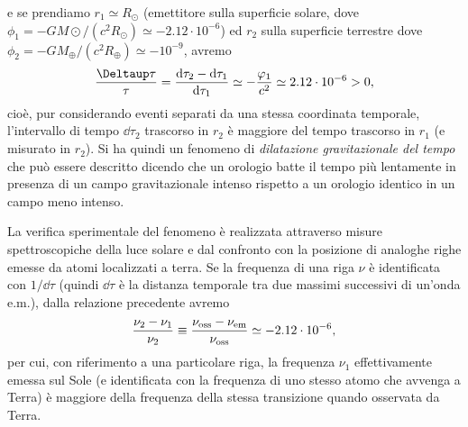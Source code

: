 e se prendiamo $r_1 \simeq R_\odot$ (emettitore sulla superficie solare, dove
$\phi_1 = - GM{\odot}/(c^2 R_{\odot}) \simeq -2.12 \cdot 10^{-6}$) ed $r_2$
sulla superficie terrestre dove $\phi_2 = -GM_{\oplus}/(c^2 R_{\oplus}) \simeq -
10^{-9}$, avremo
\begin{equation}
  \frac{\var\tau}{\tau} = \frac{\dd\tau_{2} - \dd\tau_{1}}{\dd\tau_{1}} \simeq 
  - \frac{\phi_{1}}{c^{2}} \simeq 2.12 \cdot 10^{-6} > 0,
\end{equation}
cioè, pur considerando eventi separati da una stessa coordinata temporale,
l'intervallo di tempo $\dd\tau_2$ trascorso in $r_{2}$ è maggiore del tempo
trascorso in $r_{1}$ (e misurato in $r_2$).  Si ha quindi un fenomeno di
 \emph{dilatazione
  gravitazionale del tempo} che può essere descritto dicendo che un orologio
batte il tempo più lentamente in presenza di un campo gravitazionale intenso
rispetto a un orologio identico in un campo meno intenso.

La verifica sperimentale del fenomeno è realizzata attraverso misure
spettroscopiche della luce solare e dal confronto con la posizione di analoghe
righe emesse da atomi localizzati a terra.  Se la frequenza di una riga $\nu$ è
identificata con $1/\dd\tau$ (quindi $\dd\tau$ è la distanza temporale tra due
massimi successivi di un'onda e.m.), dalla relazione precedente avremo
\begin{equation}
  \frac{\nu_2 - \nu_1} {\nu_2}  \equiv \frac{\nu_{\textup{oss}} -
    \nu_{\textup{em}}}{\nu_{\textup{oss}}} \simeq - 2.12 \cdot 10^{-6},
\end{equation}
per cui, con riferimento a una particolare riga, la frequenza $\nu_1$
effettivamente emessa sul Sole (e identificata con la frequenza di uno stesso
atomo che avvenga a Terra) è maggiore della frequenza della stessa transizione
quando osservata da Terra.

